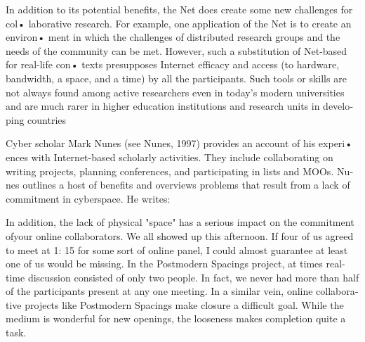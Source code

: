 \documentclass[a4paper,12pt]{article}
\begin{document}
\begin{latin}


\vspace{0.1cm}
\vspace{0.1cm}
\vspace{0.1cm}
\noindent
In addition  to  its potential benefits, the Net  does create some new challenges  for col• laborative research.  For example,  one application  of the Net  is to create an environ• ment  in which  the  challenges  of distributed research groups  and  the  needs  of the community can be met. However, such a substitution of Net-based for real-life  con• texts presupposes  Internet efficacy and access (to hardware, bandwidth, a space, and a time) by all the participants. Such tools or skills are not  always found  among  active researchers even in today's modern universities and are much rarer in higher education institutions and research units in developing countries


\vspace{0.1cm}
\vspace{0.1cm}
\vspace{0.1cm}
\indent
Cyber scholar Mark Nunes  (see Nunes,  1997) provides an account of his experi•
\noindent
ences with Internet-based scholarly activities. They include collaborating on writing projects, planning  conferences, and participating in lists and MOOs. Nunes  outlines a host  of benefits  and  overviews problems  that  result  from  a  lack of commitment in cyberspace. He writes:

\indent
In addition, the lack of physical "space" has a serious impact on the commitment ofyour online  collaborators.  We all showed up this afternoon.  If four of us agreed to  meet at
1: 15  for some sort of online panel, I could almost guarantee  at least one of us would be missing. In the Postmodern Spacings project, at times real-time  discussion consisted of only two people. In fact, we never had more than half of the participants present  at any one meeting. In a  similar vein, online collaborative  projects like Postmodern Spacings make closure a  difficult goal. While  the medium  is wonderful for new openings, the looseness makes completion  quite a task.


\end{latin}
\end{document}
